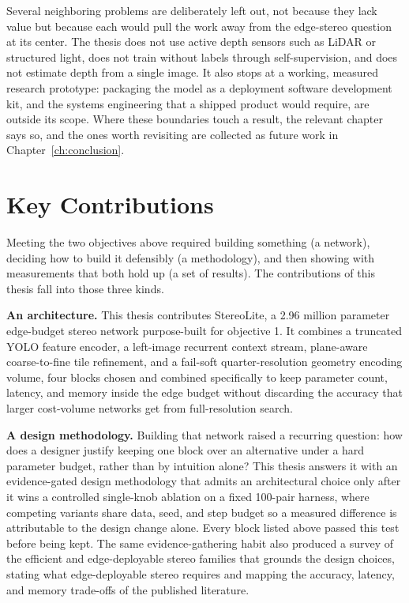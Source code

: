 Several neighboring problems are deliberately left out, not because they
lack value but because each would pull the work away from the edge-stereo
question at its center. The thesis does not use active depth sensors such
as LiDAR or structured light, does not train without labels through
self-supervision, and does not estimate depth from a single image. It
also stops at a working, measured research prototype: packaging the model
as a deployment software development kit, and the systems engineering that
a shipped product would require, are outside its scope. Where these
boundaries touch a result, the relevant chapter says so, and the ones
worth revisiting are collected as future work in
Chapter~\ref{ch:conclusion}.

\FloatBarrier
\section{Key Contributions}
Meeting the two objectives above required building something (a
network), deciding how to build it defensibly (a methodology), and then
showing with measurements that both hold up (a set of results). The
contributions of this thesis fall into those three kinds.

\textbf{An architecture.} This thesis contributes StereoLite, a 2.96
million parameter edge-budget stereo network purpose-built for objective
1. It combines a truncated YOLO feature encoder, a left-image recurrent
context stream, plane-aware coarse-to-fine tile refinement, and a
fail-soft quarter-resolution geometry encoding volume, four blocks
chosen and combined specifically to keep parameter count, latency, and
memory inside the edge budget without discarding the accuracy that
larger cost-volume networks get from full-resolution search.

\textbf{A design methodology.} Building that network raised a recurring
question: how does a designer justify keeping one block over an
alternative under a hard parameter budget, rather than by intuition
alone? This thesis answers it with an evidence-gated design methodology
that admits an architectural choice only after it wins a controlled
single-knob ablation on a fixed 100-pair harness, where competing
variants share data, seed, and step budget so a measured difference is
attributable to the design change alone. Every block listed above
passed this test before being kept. The same evidence-gathering habit
also produced a survey of the efficient and edge-deployable stereo
families that grounds the design choices, stating what edge-deployable
stereo requires and mapping the accuracy, latency, and memory
trade-offs of the published literature.

